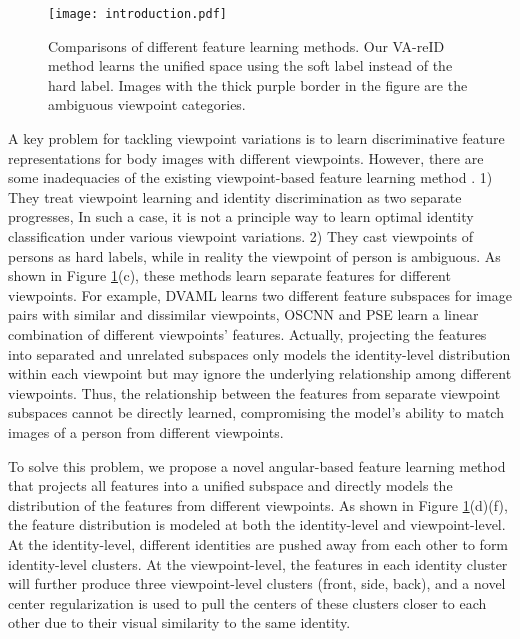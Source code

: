 \documentclass[letterpaper]{article} \usepackage{aaai20}  \usepackage{times}  \usepackage{helvet} \usepackage{courier}  \usepackage[hyphens]{url}  \usepackage{graphicx} \usepackage{array}
\begin{document}
\begin{figure}[t]
\centering
\texttt{[image: introduction.pdf]} \caption{Comparisons of different feature learning methods. Our VA-reID method learns the unified space using the soft label instead of the hard label. Images with the thick purple border in the figure are the ambiguous viewpoint categories.}
\label{fig:intro}
\end{figure}

A key problem for tackling viewpoint variations is to learn discriminative feature representations for body images with different viewpoints. However, there are some inadequacies of the existing viewpoint-based feature learning method \cite{ijcai2018-86,chen2018person,Qian_2018_ECCV,Sarfraz_2018_CVPR}. 1) They treat viewpoint learning and identity discrimination as two separate progresses, In such a case, it is not a principle way to learn optimal identity classification under various viewpoint variations. 2) They cast viewpoints of persons as hard labels, while in reality the viewpoint of person is ambiguous. As shown in Figure \ref{fig:intro}(c), these methods learn separate features for different viewpoints. For example, DVAML \cite{ijcai2018-86} learns two different feature subspaces for image pairs with similar and dissimilar viewpoints, OSCNN \cite{chen2018person} and PSE \cite{Sarfraz_2018_CVPR} learn a linear combination of different viewpoints' features. Actually, projecting the features into separated and unrelated subspaces only models the identity-level distribution within each viewpoint but may ignore the underlying relationship among different viewpoints. Thus, the relationship between the features from separate viewpoint subspaces cannot be directly learned, compromising the model's ability to match images of a person from different viewpoints.


To solve this problem, we propose a novel angular-based feature learning method that projects all features into a unified subspace and directly models the distribution of the features from different viewpoints. As shown in Figure \ref{fig:intro}(d)(f), the feature distribution is modeled at both the identity-level and viewpoint-level. At the identity-level, different identities are pushed away from each other to form identity-level clusters. At the viewpoint-level, the features in each identity cluster will further produce three viewpoint-level clusters (front, side, back), and a novel center regularization is used to pull the centers of these clusters closer to each other due to their visual similarity to the same identity. 
\end{document}
